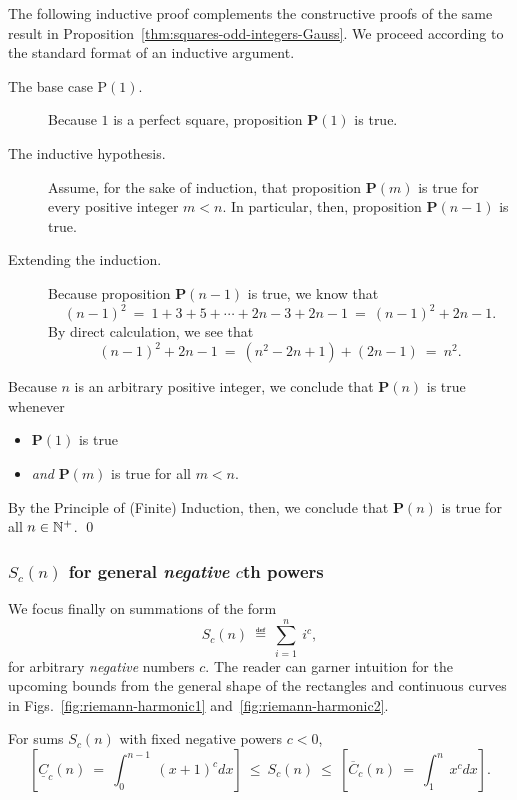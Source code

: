The following inductive proof complements the constructive proofs of
the same result in Proposition~\ref{thm:squares-odd-integers-Gauss}.
We proceed according to the standard format of an inductive argument.

\begin{description}
\item[{\sf The base case P$(1)$}.]
%
Because $1$ is a perfect square, proposition {\bf P}$(1)$ is true.

\item[{\sf The inductive hypothesis}.]
%
Assume, for the sake of induction, that proposition {\bf P}$(m)$ is
true for every positive integer $m < n$.  In particular, then,
proposition {\bf P}$(n-1)$ is true.

\item[{\sf Extending the induction}.]
%
Because proposition {\bf P}$(n-1)$ is true, we know that
\[ (n-1)^2 \ = \
 1 + 3 + 5 + \cdots + 2n-3 + 2n-1 \ = \ (n-1)^2 + 2n-1.  \]
By direct calculation, we see that
\[ (n-1)^2 + 2n-1 \ = \ (n^2 -2n +1) + (2n-1) \ = \ n^2. \]
\end{description}
Because $n$ is an arbitrary positive integer, we conclude that
{\bf P}$(n)$ is true whenever
\begin{itemize}
\item
{\bf P}$(1)$ is true
\item
{\em and}
{\bf P}$(m)$ is true for all $m < n$.
\end{itemize}
By the Principle of (Finite) Induction, then, we conclude that {\bf
  P}$(n)$ is true for all $n \in \mathbb{N}^+$.
\qed


\subsubsection{$S_c(n)$ for general {\em negative} $c$th powers}
\label{sec:sum-of-i2c<0}

We focus finally on summations of the form
\[ S_c(n) \ \eqdef \ \sum_{i=1}^n \ i^c, \]
for arbitrary {\em negative} numbers $c$.  The reader can garner
intuition for the upcoming bounds from the general shape of the
rectangles and continuous curves in Figs.~\ref{fig:riemann-harmonic1}
and~\ref{fig:riemann-harmonic2}.

\begin{prop}
\label{thm:general-bounds-negative-xc}
For sums $S_c(n)$ with fixed negative powers $c<0$,
\begin{equation} 
\label{eq:general-bounds-negative-xc}
\left[
\underline{C}_c(n) \ = \
\int_0^{n-1} \ (x+1)^c dx
\right]
\ \leq \ S_c(n) \ \leq \
\left[
\overline{C}_c(n) \ = \
\int_1^n \ x^c dx
\right].
\end{equation}
\end{prop}

